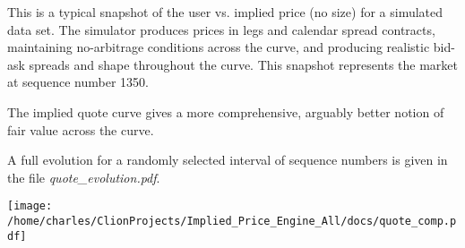 \documentclass{article}
\begin{document}
This is a typical snapshot of the user vs. implied price (no size) for a simulated data set. The simulator produces prices in legs and calendar spread contracts, maintaining no-arbitrage conditions across the curve, and producing realistic bid-ask spreads and shape throughout the curve. This snapshot represents the market at sequence number 1350.


The implied quote curve gives a more comprehensive, arguably better notion of fair value across the curve.



A full evolution for a randomly selected interval of sequence numbers is given in the file {\it quote{\_}evolution.pdf}.

\texttt{[image: /home/charles/ClionProjects/Implied\_Price\_Engine\_All/docs/quote\_comp.pdf]}
\end{document}
